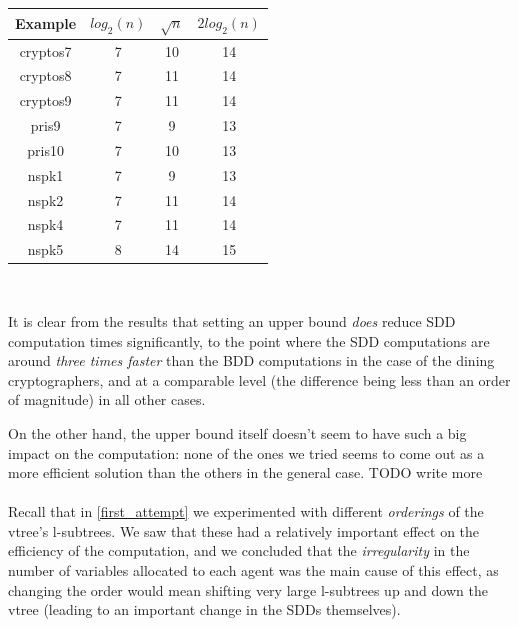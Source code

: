\documentclass[11pt]{article}
\begin{document}
{\centering
\begin{tabular}{*{3}{c|}c}
Example & $log_2(n)$ & $\sqrt{n}$ & $2log_2(n)$  \\
\hline
cryptos7 & 7 & 10 & 14   \\
cryptos8 & 7 & 11& 14 \\
cryptos9 & 7& 11 & 14  \\
pris9 & 7& 9 & 13   \\
pris10 & 7& 10 & 13   \\
nspk1 & 7& 9 & 13   \\
nspk2 & 7& 11 & 14  \\
nspk4 & 7& 11 & 14   \\
nspk5 & 8& 14 & 15   \\
\end{tabular}
\\\vspace{0.5in}}

\noindent It is clear from the results that setting an upper bound \textit{does} reduce SDD computation times significantly, to the point where the SDD computations are around \textit{three times faster} than the BDD computations in the case of the dining cryptographers, and at a comparable level (the difference being less than an order of magnitude) in all other cases. 

On the other hand, the upper bound itself doesn't seem to have such a big impact on the computation: none of the ones we tried seems to come out as a more efficient solution than the others in the general case. TODO write more
\\\\

Recall that in \ref{first_attempt} we experimented with different \textit{orderings }of the vtree's l-subtrees. We saw that these had a relatively important effect on the efficiency of the computation, and we concluded that the \textit{irregularity} in the number of variables allocated to each agent was the main cause of this effect, as changing the order would mean shifting very large l-subtrees up and down the vtree (leading to an important change in the SDDs themselves). 
\end{document}
